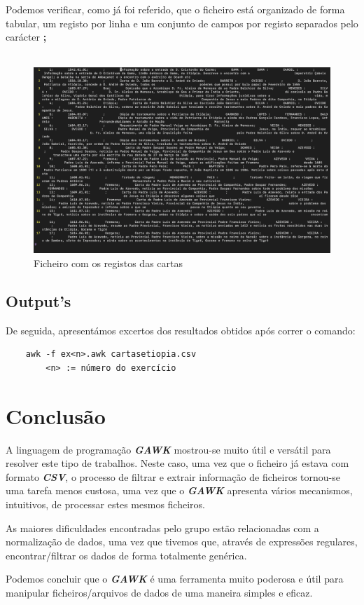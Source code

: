 \documentclass[11pt,a4paper]{report}
\begin{document}
\qquad Podemos verificar, como já foi referido, que o ficheiro está organizado de forma tabular, um registo por linha e um conjunto de campos por registo separados pelo carácter \textbf{;}
\\
\\
\begin{figure}[h]
\includegraphics[width=\textwidth]{cartas2.png}
\caption{Ficheiro com os registos das cartas}
\end{figure}

\newpage
\section{Output's}

\quad De seguida, apresentámos excertos dos resultados obtidos após correr o comando:

\begin{verbatim}
    awk -f ex<n>.awk cartasetiopia.csv
        <n> := número do exercício
\end{verbatim}

\chapter{Conclusão}

\qquad A linguagem de programação \textbf{\textit{GAWK}} mostrou-se muito útil e versátil para resolver este tipo de trabalhos. Neste caso, uma vez que o ficheiro já estava com formato \textbf{\textit{CSV}}, o processo de filtrar e extrair informação de ficheiros tornou-se uma tarefa menos custosa, uma vez que o \textit{\textbf{GAWK}} apresenta vários mecanismos, intuitivos, de processar estes mesmos ficheiros.

\qquad As maiores dificuldades encontradas pelo grupo estão relacionadas com a normalização de dados, uma vez que tivemos que, através de expressões regulares, encontrar/filtrar os dados de forma totalmente genérica. 

\qquad Podemos concluir que o \textbf{\textit{GAWK}} é uma ferramenta muito poderosa e útil para manipular ficheiros/arquivos de dados de uma maneira simples e eficaz.
\end{document}
